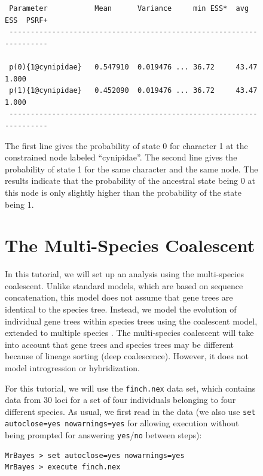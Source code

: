 \documentclass[12pt]{book}
\newcommand{\ttt}[1]{\texttt{#1}}
\begin{document}
\begin{figure}[h]
\begin{singlespacing}
\footnotesize
\begin{verbatim}
 Parameter           Mean      Variance     min ESS*  avg ESS  PSRF+
 --------------------------------------------------------------------

 p(0){1@cynipidae}   0.547910  0.019476 ... 36.72     43.47    1.000
 p(1){1@cynipidae}   0.452090  0.019476 ... 36.72     43.47    1.000
 --------------------------------------------------------------------
\end{verbatim}
\end{singlespacing}
\normalsize

The first line gives the probability of state 0 for character 1 at the constrained node labeled
``cynipidae''. The second line gives the probability of state 1 for the same character and the same
node. The results indicate that the probability of the ancestral state being 0 at this node is only
slightly higher than the probability of the state being 1.


\section{The Multi-Species Coalescent}
\label{theMultiSpeciesCoalescent}

In this tutorial, we will set up an analysis using the multi-species coalescent. Unlike standard
models, which are based on sequence concatenation, this model does not assume that gene trees are
identical to the species tree. Instead, we model the evolution of individual gene trees within
species trees using the coalescent model, extended to multiple species \citep{liu07,edwards07}. The
multi-species coalescent will take into account that gene trees and species trees may be different
because of lineage sorting (deep coalescence). However, it does not model introgression or
hybridization.

For this tutorial, we will use the \ttt{finch.nex} data set, which contains data from 30 loci for a
set of four individuals belonging to four different species. As usual, we first read in the data
(we also use \ttt{set autoclose=yes nowarnings=yes} for allowing execution without being prompted
for answering \ttt{yes}/\ttt{no} between steps):

\begin{singlespacing}
\small
\begin{verbatim}
MrBayes > set autoclose=yes nowarnings=yes
MrBayes > execute finch.nex
\end{verbatim}
\end{singlespacing}
\normalsize


\end{figure}
\end{document}

